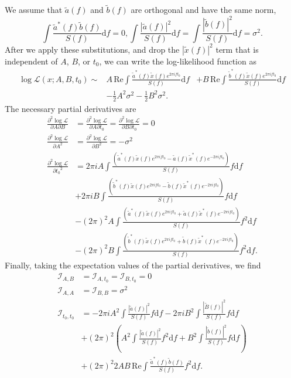\documentclass{iopart}
\begin{document}
%
We assume that $\tilde{a}(f)$ and $\tilde{b}(f)$ are orthogonal and have the same norm,
%
\begin{equation}
	\int \frac{\tilde{a}^*(f) \tilde{b}(f)}{S(f)} \mathrm{d}f = 0,
	\int \frac{|\tilde{a}(f)|^2}{S(f)} \mathrm{d}f =
	\int \frac{|\tilde{b}(f)|^2}{S(f)} \mathrm{d}f =
	\sigma^2.
\end{equation}
%
After we apply these substitutions, and drop the $|\tilde{x}(f)|^2$ term that is independent of $A$, $B$, or $t_0$, we can write the log\nobreakdashes-likelihood function as
%
\begin{eqnarray}\label{eq:trigger-likelihood-simplified}
	\log \mathcal{L}(x; A, B, t_0) \sim
	& A \, \mathrm{Re} \int \frac{\tilde{a}^*(f) \tilde{x}(f) e^{2 \pi i f t_0}}{S(f)} \mathrm{d}f 
	&+ B \, \mathrm{Re} \int \frac{\tilde{b}^*(f) \tilde{x}(f) e^{2 \pi i f t_0} }{S(f)} \mathrm{d}f\nonumber\\
	&- \frac{1}{2} A^2 \sigma^2 - \frac{1}{2} B^2 \sigma^2.
\end{eqnarray}
%
The necessary partial derivatives are
%
\begin{eqnarray*}
	\frac{\partial^2 \log \mathcal{L}}{\partial A \partial B} &=
	\frac{\partial^2 \log \mathcal{L}}{\partial A \partial t_0} =
	\frac{\partial^2 \log \mathcal{L}}{\partial B \partial t_0} = 0 \\
	\frac{\partial^2 \log \mathcal{L}}{\partial A^2} &=
	\frac{\partial^2 \log \mathcal{L}}{\partial B^2} = - \sigma^2 \\
	\frac{\partial^2 \log \mathcal{L}}{\partial {t_0}^2} &=
	2 \pi i A \int \frac{\left(\tilde{a}^*(f) \tilde{x}(f) e^{2 \pi i f t_0} - \tilde{a}(f) \tilde{x}^*(f) e^{-2 \pi i f t_0}\right)}{S(f)} f \mathrm{d}f \\
	&+ 2 \pi i B \int \frac{\left(\tilde{b}^*(f) \tilde{x}(f) e^{2 \pi i f t_0} - \tilde{b}(f) \tilde{x}^*(f) e^{-2 \pi i f t_0}\right)}{S(f)} f \mathrm{d}f \\
	&- (2 \pi)^2 A \int \frac{\left(\tilde{a}^*(f) \tilde{x}(f) e^{2 \pi i f t_0} + \tilde{a}(f) \tilde{x}^*(f) e^{-2 \pi i f t_0}\right)}{S(f)} f^2 \mathrm{d}f \\
	&- (2 \pi)^2 B \int \frac{\left(\tilde{b}^*(f) \tilde{x}(f) e^{2 \pi i f t_0} + \tilde{b}(f) \tilde{x}^*(f) e^{-2 \pi i f t_0}\right)}{S(f)} f^2 \mathrm{d}f.
\end{eqnarray*}
%
Finally, taking the expectation values of the partial derivatives, we find
%
\begin{eqnarray*}
	\mathcal{I}_{A,B} &= \mathcal{I}_{A,t_0} = \mathcal{I}_{B,t_0} = 0 \\
	\mathcal{I}_{A,A} &= \mathcal{I}_{B,B} = \sigma^2 \\
	\mathcal{I}_{t_0,t_0} &=
	- 2 \pi i A^2 \int \frac{|\tilde{a}(f)|^2}{S(f)} f\mathrm{d}f
	- 2 \pi i B^2 \int \frac{|\tilde{B}(f)|^2}{S(f)} f\mathrm{d}f \\
	&+ (2 \pi)^2 \left(A^2 \int \frac{|\tilde{a}(f)|^2}{S(f)} f^2\mathrm{d}f +
	B^2 \int \frac{|\tilde{b}(f)|^2}{S(f)} f\mathrm{d}f \right) \\
	&+ (2\pi)^2 2 A B \, \mathrm{Re} \int \frac{\tilde{a}^*(f)\tilde{b}(f)}{S(f)} f^2\mathrm{d}f.
\end{eqnarray*}
\end{document}
